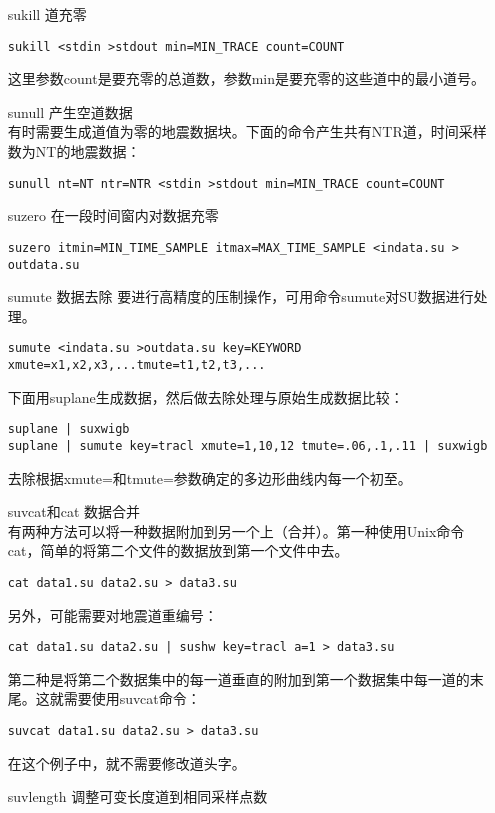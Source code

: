 \begin{enumerate}
	\item[sukill] 道充零
\begin{lstlisting}
sukill <stdin >stdout min=MIN_TRACE count=COUNT
\end{lstlisting}
	这里参数count是要充零的总道数，参数min是要充零的这些道中的最小道号。
	\item[sunull] 产生空道数据\\
	有时需要生成道值为零的地震数据块。下面的命令产生共有NTR道，时间采样数为NT的地震数据：
\begin{lstlisting}
sunull nt=NT ntr=NTR <stdin >stdout min=MIN_TRACE count=COUNT
\end{lstlisting}	
	\item[suzero] 在一段时间窗内对数据充零
\begin{lstlisting}
suzero itmin=MIN_TIME_SAMPLE itmax=MAX_TIME_SAMPLE <indata.su > outdata.su
\end{lstlisting}
	\item[sumute] 数据去除	
	要进行高精度的压制操作，可用命令sumute对SU数据进行处理。
\begin{lstlisting}
sumute <indata.su >outdata.su key=KEYWORD xmute=x1,x2,x3,...tmute=t1,t2,t3,...
\end{lstlisting}
	下面用suplane生成数据，然后做去除处理与原始生成数据比较：
\begin{lstlisting}
suplane | suxwigb 
suplane | sumute key=tracl xmute=1,10,12 tmute=.06,.1,.11 | suxwigb 
\end{lstlisting}
	去除根据xmute=和tmute=参数确定的多边形曲线内每一个初至。
	\item[suvcat和cat] 数据合并\\
	有两种方法可以将一种数据附加到另一个上（合并）。第一种使用Unix命令cat，简单的将第二个文件的数据放到第一个文件中去。
\begin{lstlisting}
cat data1.su data2.su > data3.su
\end{lstlisting}	
	另外，可能需要对地震道重编号：
\begin{lstlisting}
cat data1.su data2.su | sushw key=tracl a=1 > data3.su
\end{lstlisting}	
	第二种是将第二个数据集中的每一道垂直的附加到第一个数据集中每一道的末尾。这就需要使用suvcat命令：
\begin{lstlisting}
suvcat data1.su data2.su > data3.su
\end{lstlisting}
	在这个例子中，就不需要修改道头字。
	\item[suvlength] 调整可变长度道到相同采样点数	\\

\end{enumerate}
